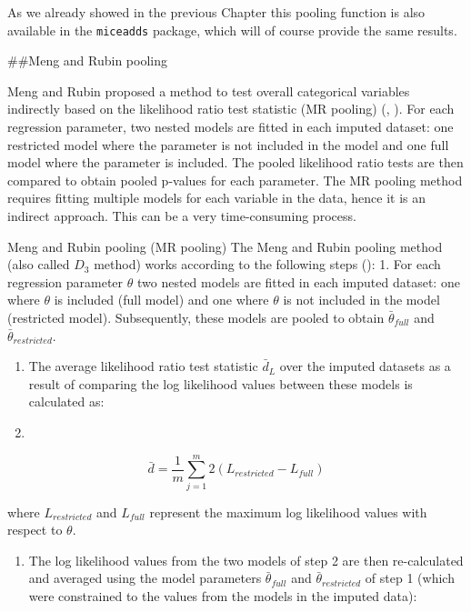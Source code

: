 \documentclass[
]{book}
\providecommand{\tightlist}{%
  \setlength{\itemsep}{0pt}\setlength{\parskip}{0pt}}
\begin{document}
As we already showed in the previous Chapter this pooling function is also available in the \texttt{miceadds} package, which will of course provide the same results.

\#\#Meng and Rubin pooling

Meng and Rubin proposed a method to test overall categorical variables indirectly based on the likelihood ratio test statistic (MR pooling) (\citet{Meng1992}, \citet{Mistler2013}). For each regression parameter, two nested models are fitted in each imputed dataset: one restricted model where the parameter is not included in the model and one full model where the parameter is included. The pooled likelihood ratio tests are then compared to obtain pooled p-values for each parameter. The MR pooling method requires fitting multiple models for each variable in the data, hence it is an indirect approach. This can be a very time-consuming process.

Meng and Rubin pooling (MR pooling)
The Meng and Rubin pooling method (also called \(D_3\) method) works according to the following steps (\citet{Meng1992}):
1. For each regression parameter \(\theta\) two nested models are fitted in each imputed dataset: one where \(\theta\) is included (full model) and one where \(\theta\) is not included in the model (restricted model). Subsequently, these models are pooled to obtain \(\bar\theta_{full}\) and \(\bar\theta_{restricted}\).

\begin{enumerate}
\def\labelenumi{\arabic{enumi}.}
\setcounter{enumi}{1}
\item
  The average likelihood ratio test statistic \(\bar d_L\) over the imputed datasets as a result of comparing the log likelihood values between these models is calculated as:
\item
\end{enumerate}

\[\bar d = \frac{1}{m} \sum_{j=1}^m 2(L_{restricted} - L_{full})\]

where \(L_{restricted}\) and \(L_{full}\) represent the maximum log likelihood values with respect to \(\theta\).

\begin{enumerate}
\def\labelenumi{\arabic{enumi}.}
\setcounter{enumi}{3}
\tightlist
\item
  The log likelihood values from the two models of step 2 are then re-calculated and averaged using the model parameters \(\bar\theta_{full}\) and \(\bar\theta_{restricted}\) of step 1 (which were constrained to the values from the models in the imputed data):
\end{enumerate}
\end{document}
